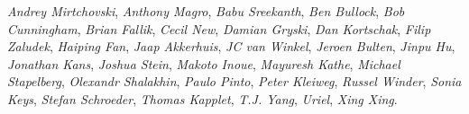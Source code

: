 \emph{Andrey Mirtchovski},
\emph{Anthony Magro},
\emph{Babu Sreekanth},
\emph{Ben Bullock},
\emph{Bob Cunningham},
\emph{Brian Fallik},
\emph{Cecil New},
\emph{Damian Gryski},
\emph{Dan Kortschak},
\emph{Filip Zaludek},
\emph{Haiping Fan},
\emph{Jaap Akkerhuis},
\emph{JC van Winkel},
\emph{Jeroen Bulten},
\emph{Jinpu Hu},
\emph{Jonathan Kans},
\emph{Joshua Stein},
\emph{Makoto Inoue},
\emph{Mayuresh Kathe},
\emph{Michael Stapelberg},
\emph{Olexandr Shalakhin},
\emph{Paulo Pinto},
\emph{Peter Kleiweg},
\emph{Russel Winder},
\emph{Sonia Keys},
\emph{Stefan Schroeder},
\emph{Thomas Kapplet},
\emph{T.J. Yang},
\emph{Uriel},
\emph{Xing Xing}.
